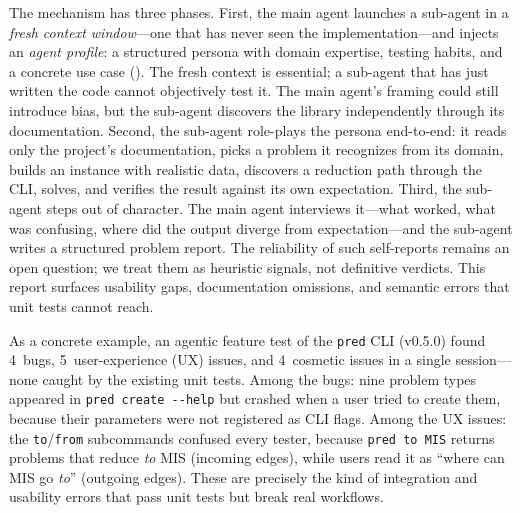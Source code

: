 \documentclass[conference]{IEEEtran}
\begin{document}
The mechanism has three phases.
First, the main agent launches a sub-agent in a \emph{fresh context window}---one that has never seen the implementation---and injects an \emph{agent profile}: a structured persona with domain expertise, testing habits, and a concrete use case ().
The fresh context is essential; a sub-agent that has just written the code cannot objectively test it.
The main agent's framing could still introduce bias, but the sub-agent discovers the library independently through its documentation.
Second, the sub-agent role-plays the persona end-to-end: it reads only the project's documentation, picks a problem it recognizes from its domain, builds an instance with realistic data, discovers a reduction path through the CLI, solves, and verifies the result against its own expectation.
Third, the sub-agent steps out of character.
The main agent interviews it---what worked, what was confusing, where did the output diverge from expectation---and the sub-agent writes a structured problem report.
The reliability of such self-reports remains an open question; we treat them as heuristic signals, not definitive verdicts.
This report surfaces usability gaps, documentation omissions, and semantic errors that unit tests cannot reach.

As a concrete example, an agentic feature test of the \texttt{pred} CLI (v0.5.0) found 4~bugs, 5~user-experience (UX) issues, and 4~cosmetic issues in a single session---none caught by the existing unit tests.
Among the bugs: nine problem types appeared in \texttt{pred create -{}-help} but crashed when a user tried to create them, because their parameters were not registered as CLI flags.
Among the UX issues: the \texttt{to}/\texttt{from} subcommands confused every tester, because \texttt{pred to MIS} returns problems that reduce \emph{to} MIS (incoming edges), while users read it as ``where can MIS go \emph{to}'' (outgoing edges).
These are precisely the kind of integration and usability errors that pass unit tests but break real workflows.
\end{document}
